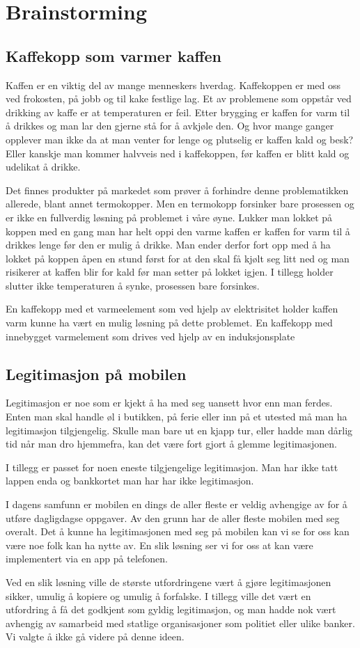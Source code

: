 \chapter{Brainstorming}
\section{Kaffekopp som varmer kaffen}
Kaffen er en viktig del av mange menneskers hverdag. Kaffekoppen er med oss ved frokosten, på jobb og til kake festlige lag. Et av problemene som oppstår ved drikking av kaffe er at temperaturen er feil. Etter brygging er kaffen for varm til å drikkes og man lar den gjerne stå for å avkjøle den. Og hvor mange ganger opplever man ikke da at man venter for lenge og plutselig er kaffen kald og besk? Eller kanskje man kommer halvveis ned i kaffekoppen, før kaffen er blitt kald og udelikat å drikke.

Det finnes produkter på markedet som prøver å forhindre denne problematikken allerede, blant annet termokopper. Men en termokopp forsinker bare prosessen og er ikke en fullverdig løsning på problemet i våre øyne. Lukker man lokket på koppen med en gang man har helt oppi den varme kaffen er kaffen for varm til å drikkes lenge før den er mulig å drikke. Man ender derfor fort opp med å ha lokket på koppen åpen en stund først for at den skal få kjølt seg litt ned og man risikerer at kaffen blir for kald før man setter på lokket igjen. I tillegg holder slutter ikke temperaturen å synke, prosessen bare forsinkes.

En kaffekopp med et varmeelement som ved hjelp av elektrisitet holder kaffen varm kunne ha vært en mulig løsning på dette problemet. En kaffekopp med innebygget varmelement som drives ved hjelp av en induksjonsplate 


\section{Legitimasjon på mobilen}
Legitimasjon er noe som er kjekt å ha med seg uansett hvor enn man ferdes. Enten man skal handle øl i butikken, på ferie eller inn på et utested må man ha legitimasjon tilgjengelig. Skulle man bare ut en kjapp tur, eller hadde man dårlig tid når man dro hjemmefra, kan det være fort gjort å glemme legitimasjonen.

I tillegg er passet for noen eneste tilgjengelige legitimasjon. Man har ikke tatt lappen enda og bankkortet man har har ikke legitimasjon.

I dagens samfunn er mobilen en dings de aller fleste er veldig avhengige av for å utføre dagligdagse oppgaver. Av den grunn har de aller fleste mobilen med seg overalt. Det å kunne ha legitimasjonen med seg på mobilen kan vi se for oss kan være noe folk kan ha nytte av. En slik løsning ser vi for oss at kan være implementert via en app på telefonen.

Ved en slik løsning ville de største utfordringene vært å gjøre legitimasjonen sikker, umulig å kopiere og umulig å forfalske. I tillegg ville det vært en utfordring å få det godkjent som gyldig legitimasjon, og man hadde nok vært avhengig av samarbeid med statlige organisasjoner som politiet eller ulike banker. Vi valgte å ikke gå videre på denne ideen.